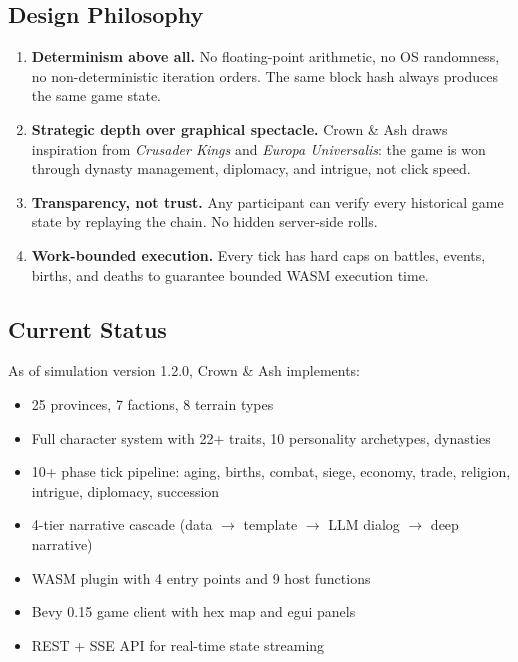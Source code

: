 \documentclass[a4paper, 11pt]{article}
\newcommand{\simversion}{1.2.0}
\begin{document}
\subsection{Design Philosophy}

\begin{enumerate}
  \item \textbf{Determinism above all.} No floating-point arithmetic, no OS
    randomness, no non-deterministic iteration orders. The same block hash
    always produces the same game state.
  \item \textbf{Strategic depth over graphical spectacle.} Crown \& Ash draws
    inspiration from \emph{Crusader Kings} and \emph{Europa Universalis}: the
    game is won through dynasty management, diplomacy, and intrigue, not
    click speed.
  \item \textbf{Transparency, not trust.} Any participant can verify every
    historical game state by replaying the chain. No hidden server-side rolls.
  \item \textbf{Work-bounded execution.} Every tick has hard caps on battles,
    events, births, and deaths to guarantee bounded WASM execution time.
\end{enumerate}

\subsection{Current Status}

As of simulation version \simversion{}, Crown \& Ash implements:

\begin{itemize}
  \item 25 provinces, 7 factions, 8 terrain types
  \item Full character system with 22+ traits, 10 personality archetypes, dynasties
  \item 10+ phase tick pipeline: aging, births, combat, siege, economy, trade,
    religion, intrigue, diplomacy, succession
  \item 4-tier narrative cascade (data $\to$ template $\to$ LLM dialog $\to$ deep narrative)
  \item WASM plugin with 4 entry points and 9 host functions
  \item Bevy 0.15 game client with hex map and egui panels
  \item REST + SSE API for real-time state streaming
\end{itemize}


\end{document}
